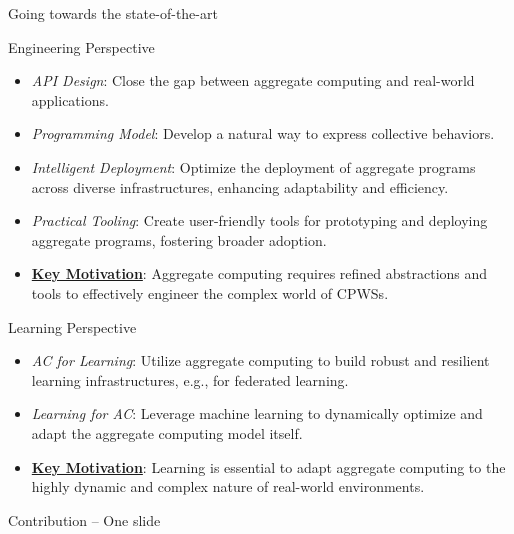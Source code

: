 \documentclass[presentation, 9pt,169]{beamer}\mode<presentation>{\usetheme{AMSBolognaFC}}
\begin{document}
\begin{frame}{Going towards the state-of-the-art}
  \begin{alertblock}{Engineering Perspective}
    \begin{itemize}
    \item \emph{API Design}: Close the gap between aggregate computing and real-world applications.%
    \item \emph{Programming Model}: Develop a natural way to express collective behaviors.%
    \item \emph{Intelligent Deployment}: Optimize the deployment of aggregate programs across diverse infrastructures, enhancing adaptability and efficiency.
    \item \emph{Practical Tooling}: Create user-friendly tools for prototyping and deploying aggregate programs, fostering broader adoption.
    \item \textbf{\underline{Key Motivation}}: Aggregate computing requires refined abstractions and tools to effectively engineer the complex world of CPWSs.
    \end{itemize}
    \end{alertblock}
  \begin{alertblock}{Learning Perspective}
      \begin{itemize}
      \item \emph{AC for Learning}: Utilize aggregate computing to build robust and resilient learning infrastructures, e.g., for federated learning.
      \item \emph{Learning for AC}: Leverage machine learning to dynamically optimize and adapt the aggregate computing model itself.
      \item \textbf{\underline{Key Motivation}}: Learning is essential to adapt aggregate computing to the highly dynamic and complex nature of real-world environments.
      \end{itemize}
  \end{alertblock}
\end{frame}
\begin{frame}{Contribution -- One slide}
\\[0.5cm]
\begin{center}
\end{center}
\end{frame}
\end{document}
